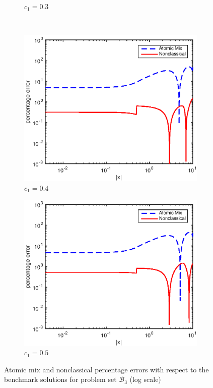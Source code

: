 \documentclass[12pt]{article}
\newcommand{\setb}{\mathcal{B}}
\begin{document}
{\begin{figure}[p]
\begin{subfigure}{0.495\textwidth}
        \caption{$c_1 = 0.3$}
        \label{figerrF30}
    \end{subfigure}
    \\
    \centering
    \begin{subfigure}{0.495\textwidth}
        \centering
        \includegraphics[width=\textwidth]{NSE_err_F40.eps}
        \caption{$c_1 = 0.4$}
        \label{figerrF40}
    \end{subfigure}
    \hfill
    \begin{subfigure}{0.495\textwidth}
        \centering
        \includegraphics[width=\textwidth]{NSE_err_F50.eps}
        \caption{$c_1 = 0.5$}
        \label{figerrF50}
    \end{subfigure}
    \caption{Atomic mix and nonclassical percentage errors with respect to the benchmark solutions for problem set $\setb_3$ (log scale)}
    \label{figerrF1}
\end{figure}





}
\end{document}

